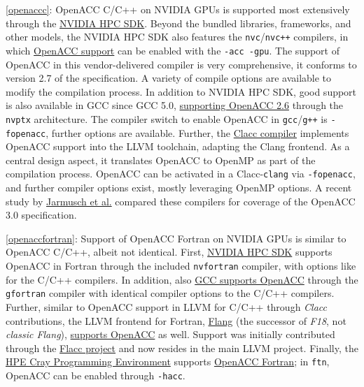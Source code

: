 \item \ref{openaccc}: OpenACC C/C++ on NVIDIA GPUs is supported most extensively through the \href{https://developer.nvidia.com/hpc-sdk}{NVIDIA HPC SDK}. Beyond the bundled libraries, frameworks, and other models, the NVIDIA HPC SDK also features the \texttt{nvc}/\texttt{nvc++} compilers, in which \href{https://docs.nvidia.com/hpc-sdk/compilers/hpc-compilers-user-guide/index.html\#acc-use}{OpenACC support} can be enabled with the \texttt{-acc\ -gpu}. The support of OpenACC in this vendor-delivered compiler is very comprehensive, it conforms to version 2.7 of the specification. A variety of compile options are available to modify the compilation process. In addition to NVIDIA HPC SDK, good support is also available in GCC since GCC 5.0, \href{https://gcc.gnu.org/wiki/OpenACC}{supporting OpenACC 2.6} through the \texttt{nvptx} architecture. The compiler switch to enable OpenACC in \texttt{gcc}/\texttt{g++} is \texttt{-fopenacc}, further options are available. Further, the \href{https://csmd.ornl.gov/project/clacc}{Clacc compiler} implements OpenACC support into the LLVM toolchain, adapting the Clang frontend. As a central design aspect, it translates OpenACC to OpenMP as part of the compilation process. OpenACC can be activated in a Clacc-\texttt{clang} via \texttt{-fopenacc}, and further compiler options exist, mostly leveraging OpenMP options. A recent study by \href{https://ieeexplore.ieee.org/document/10029456}{Jarmusch et al.} compared these compilers for coverage of the OpenACC 3.0 specification.
\item \ref{openaccfortran}: Support of OpenACC Fortran on NVIDIA GPUs is similar to OpenACC C/C++, albeit not identical. First, \href{https://developer.nvidia.com/hpc-sdk}{NVIDIA HPC SDK} supports OpenACC in Fortran through the included \texttt{nvfortran} compiler, with options like for the C/C++ compilers. In addition, also \href{https://gcc.gnu.org/wiki/OpenACC}{GCC supports OpenACC} through the \texttt{gfortran} compiler with identical compiler options to the C/C++ compilers. Further, similar to OpenACC support in LLVM for C/C++ through \emph{Clacc} contributions, the LLVM frontend for Fortran, \href{https://flang.llvm.org/docs/}{Flang} (the successor of \emph{F18}, not \emph{classic Flang}), \href{https://flang.llvm.org/docs/OpenACC.html}{supports OpenACC} as well. Support was initially contributed through the \href{https://ieeexplore.ieee.org/document/9651310}{Flacc project} and now resides in the main LLVM project. Finally, the \href{https://www.hpe.com/psnow/doc/a50002303enw}{HPE Cray Programming Environment} supports \href{https://cpe.ext.hpe.com/docs/cce/man7/intro_openacc.7.html}{OpenACC Fortran}; in \texttt{ftn}, OpenACC can be enabled through \texttt{-hacc}.
